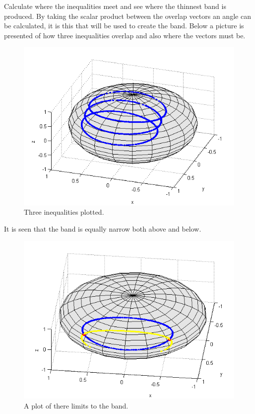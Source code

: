 \documentclass[
  utf8,%
  parskip,%
  largesmallcaps,intlimits,widermath,%
  sharecounter,nobreak,definition=marks,%
  noparts%
]{rtthesis}
\begin{document}
Calculate where the inequalities meet and see where the thinnest band is produced. By taking the scalar product between the overlap vectors an angle can be calculated, it is  this that will be used to create the band. Below a picture is presented of how three inequalities overlap and also where the vectors must be. 
\begin{figure}[H]
\begin{center}
\includegraphics[scale=0.5]{overlap114.png}
\caption{Three inequalities plotted.}
\label{fig:overlap114}
\end{center}
\end{figure}
It is seen that the band is equally narrow both above and below. 
\begin{figure}[H]
\begin{center}
\includegraphics[scale=0.5]{band.png}
\caption{A plot of there limits to the band.}
\label{fig:band}
\end{center}
\end{figure}
\end{document}
